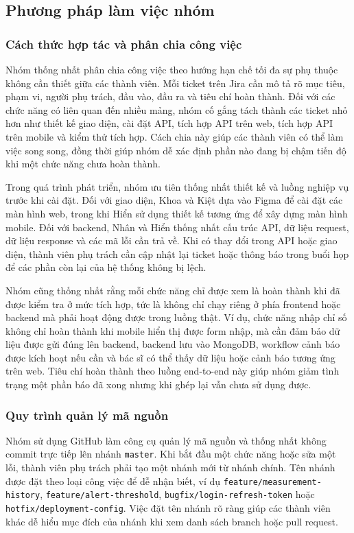 \subsection{Phương pháp làm việc nhóm}

\subsubsection{Cách thức hợp tác và phân chia công việc}
\par Nhóm thống nhất phân chia công việc theo hướng hạn chế tối đa sự phụ thuộc không cần thiết giữa các thành viên. Mỗi ticket trên Jira cần mô tả rõ mục tiêu, phạm vi, người phụ trách, đầu vào, đầu ra và tiêu chí hoàn thành. Đối với các chức năng có liên quan đến nhiều mảng, nhóm cố gắng tách thành các ticket nhỏ hơn như thiết kế giao diện, cài đặt API, tích hợp API trên web, tích hợp API trên mobile và kiểm thử tích hợp. Cách chia này giúp các thành viên có thể làm việc song song, đồng thời giúp nhóm dễ xác định phần nào đang bị chậm tiến độ khi một chức năng chưa hoàn thành.

\par Trong quá trình phát triển, nhóm ưu tiên thống nhất thiết kế và luồng nghiệp vụ trước khi cài đặt. Đối với giao diện, Khoa và Kiệt dựa vào Figma để cài đặt các màn hình web, trong khi Hiển sử dụng thiết kế tương ứng để xây dựng màn hình mobile. Đối với backend, Nhân và Hiển thống nhất cấu trúc API, dữ liệu request, dữ liệu response và các mã lỗi cần trả về. Khi có thay đổi trong API hoặc giao diện, thành viên phụ trách cần cập nhật lại ticket hoặc thông báo trong buổi họp để các phần còn lại của hệ thống không bị lệch.

\par Nhóm cũng thống nhất rằng mỗi chức năng chỉ được xem là hoàn thành khi đã được kiểm tra ở mức tích hợp, tức là không chỉ chạy riêng ở phía frontend hoặc backend mà phải hoạt động được trong luồng thật. Ví dụ, chức năng nhập chỉ số không chỉ hoàn thành khi mobile hiển thị được form nhập, mà cần đảm bảo dữ liệu được gửi đúng lên backend, backend lưu vào MongoDB, workflow cảnh báo được kích hoạt nếu cần và bác sĩ có thể thấy dữ liệu hoặc cảnh báo tương ứng trên web. Tiêu chí hoàn thành theo luồng end-to-end này giúp nhóm giảm tình trạng một phần báo đã xong nhưng khi ghép lại vẫn chưa sử dụng được.

\subsubsection{Quy trình quản lý mã nguồn}
\par Nhóm sử dụng GitHub làm công cụ quản lý mã nguồn và thống nhất không commit trực tiếp lên nhánh \texttt{master}. Khi bắt đầu một chức năng hoặc sửa một lỗi, thành viên phụ trách phải tạo một nhánh mới từ nhánh chính. Tên nhánh được đặt theo loại công việc để dễ nhận biết, ví dụ \texttt{feature/measurement-history}, \texttt{feature/alert-threshold}, \texttt{bugfix/login-refresh-token} hoặc \texttt{hotfix/deployment-config}. Việc đặt tên nhánh rõ ràng giúp các thành viên khác dễ hiểu mục đích của nhánh khi xem danh sách branch hoặc pull request.

